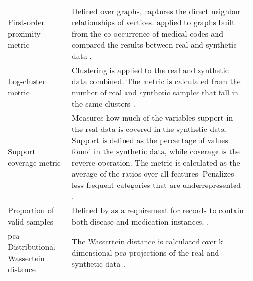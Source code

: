 \begin{table}[H]
\begin{tabularx}{\textwidth}{@{} p{} X @{}}
            First-order proximity metric & 
            Defined over graphs, captures the direct neighbor relationships of vertices. \citeauthor{Zhang2020} applied to graphs built from the co-occurrence of medical codes and compared the results between real and synthetic data \cite{Zhang2020}.\\
            
            Log-cluster metric & 
            Clustering is applied to the real and synthetic data combined. The metric is calculated from the number of real and synthetic samples that fall in the same clusters \cite{Goncalves2020}.\\
            
            Support coverage metric & 
            Measures how much of the variables support in the real data is covered in the synthetic data. Support is defined as the percentage of values found in the synthetic data, while coverage is the reverse operation. The metric is calculated as the average of the ratios over all features. Penalizes less frequent categories that are underrepresented \cite{Goncalves2020}.\\
 
            Proportion of valid samples & 
            Defined by \citeauthor{Yang_2019_ehr} as a requirement for records to contain both disease and medication instances. \cite{Yang_2019_ehr}.\\
            
            \gls{pca} Distributional Wassertein distance 
            & The Wassertein distance is calculated over k-dimensional \gls{pca} projections of the real and synthetic data \cite{tanti2019}.\\
            
            \bottomrule
        \end{tabularx}
    \end{table}